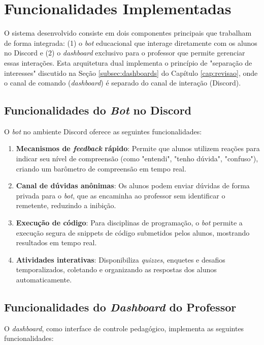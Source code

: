 \section{Funcionalidades Implementadas}
\label{sec:funcionalidades}

O sistema desenvolvido consiste em dois componentes principais que trabalham de
forma integrada: (1) o \textit{bot} educacional que interage diretamente com os
alunos no Discord e (2) o \textit{dashboard} exclusivo para o professor que
permite gerenciar essas interações. Esta arquitetura dual implementa o princípio
de "separação de interesses" discutido na Seção \ref{subsec:dashboards} do
Capítulo \ref{cap:revisao}, onde o canal de comando (\textit{dashboard}) é
separado do canal de interação (Discord).

\subsection{Funcionalidades do \textit{Bot} no Discord}
O \textit{bot} no ambiente Discord oferece as seguintes funcionalidades:

\begin{enumerate}
\item \textbf{Mecanismos de \textit{feedback} rápido}: Permite que alunos
utilizem reações para indicar seu nível de compreensão (como "entendi", "tenho
dúvida", "confuso"), criando um barômetro de compreensão em tempo real.
\item \textbf{Canal de dúvidas anônimas}: Os alunos podem enviar dúvidas de
forma privada para o \textit{bot}, que as encaminha ao professor sem identificar
o remetente, reduzindo a inibição.
\item \textbf{Execução de código}: Para disciplinas de programação, o
\textit{bot} permite a execução segura de snippets de código submetidos pelos
alunos, mostrando resultados em tempo real.
\item \textbf{Atividades interativas}: Disponibiliza \textit{quizzes}, enquetes
e desafios temporalizados, coletando e organizando as respostas dos alunos
automaticamente.
\end{enumerate}

\subsection{Funcionalidades do \textit{Dashboard} do Professor}
O \textit{dashboard}, como interface de controle pedagógico, implementa as
seguintes funcionalidades:

